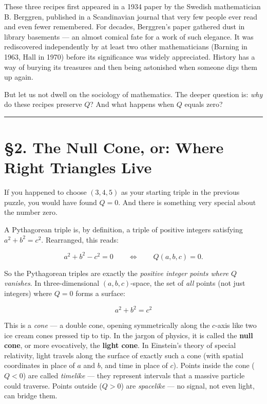 These three recipes first appeared in a 1934 paper by the Swedish mathematician B. Berggren, published in a Scandinavian journal that very few people ever read and even fewer remembered. For decades, Berggren's paper gathered dust in library basements --- an almost comical fate for a work of such elegance. It was rediscovered independently by at least two other mathematicians (Barning in 1963, Hall in 1970) before its significance was widely appreciated. History has a way of burying its treasures and then being astonished when someone digs them up again.

But let us not dwell on the sociology of mathematics. The deeper question is: \emph{why} do these recipes preserve \(Q\)? And what happens when \(Q\) equals zero?

\bigskip\noindent\rule{\linewidth}{0.4pt}\bigskip

\section{§2. The Null Cone, or: Where Right Triangles Live}
If you happened to choose \((3, 4, 5)\) as your starting triple in the previous puzzle, you would have found \(Q = 0\). And there is something very special about the number zero.

A Pythagorean triple is, by definition, a triple of positive integers satisfying \(a^2 + b^2 = c^2\). Rearranged, this reads:

\[a^2 + b^2 - c^2 = 0 \qquad\Longleftrightarrow\qquad Q(a, b, c) = 0.\]

So the Pythagorean triples are exactly the \emph{positive integer points where \(Q\) vanishes}. In three-dimensional \((a, b, c)\)-space, the set of \emph{all} points (not just integers) where \(Q = 0\) forms a surface:

\[a^2 + b^2 = c^2\]

This is a \emph{cone} --- a double cone, opening symmetrically along the \(c\)-axis like two ice cream cones pressed tip to tip. In the jargon of physics, it is called the \textbf{null cone}, or more evocatively, the \textbf{light cone}. In Einstein's theory of special relativity, light travels along the surface of exactly such a cone (with spatial coordinates in place of \(a\) and \(b\), and time in place of \(c\)). Points inside the cone (\(Q < 0\)) are called \emph{timelike} --- they represent intervals that a massive particle could traverse. Points outside (\(Q > 0\)) are \emph{spacelike} --- no signal, not even light, can bridge them.


